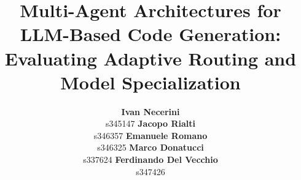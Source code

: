 \documentclass[11pt]{article}
\title{Multi-Agent Architectures for LLM-Based Code Generation:\\
 Evaluating Adaptive Routing and Model Specialization}
\author{
    \textbf{Ivan Necerini} \\
    s345147
    \And
    \textbf{Jacopo Rialti} \\
    s346357
    \And
    \textbf{Emanuele Romano} \\
    s346325
    \AND
    \textbf{Marco Donatucci} \\
    s337624
    \And
    \textbf{Ferdinando Del Vecchio} \\
    s347426
}
\begin{document}
\maketitle













\nocite{*}  %


% 
\end{document}
